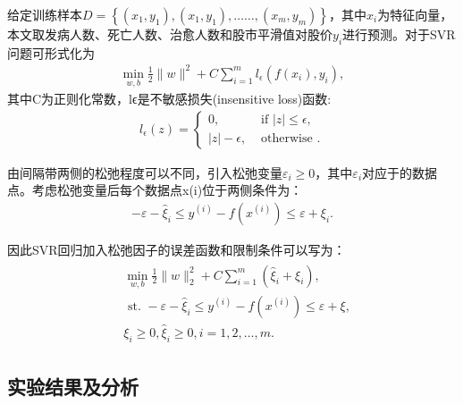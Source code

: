 \documentclass{whutmod}
\begin{document}
		给定训练样本$D=\left\{\left(x_{1}, y_{1}\right),\left(x_{1}, y_{1}\right), \ldots \ldots,\left(x_{m}, y_{m}\right)\right\}
		$，其中$x_i$为特征向量，本文取发病人数、死亡人数、治愈人数和股市平滑值对股价$y_i$进行预测。对于SVR问题可形式化为
				\begin{gather}
\min _{w, b} \frac{1}{2}\|w\|^{2}+C \sum_{i=1}^{m} l_{\epsilon}\left(f\left(x_{i}\right), y_{i}\right),
		\end{gather}
		其中C为正则化常数，lϵ是不敏感损失(insensitive loss)函数:
				\begin{gather*}
l_{\epsilon}(z)=\left\{\begin{array}{cc}
0, & \text { if }|z| \leq \epsilon ,\\
|z|-\epsilon, & \text { otherwise }.
\end{array}\right.
\end{gather*}

 由间隔带两侧的松弛程度可以不同，引入松弛变量$\varepsilon_i\geq 0$，其中$\varepsilon_i$对应于的数据点。考虑松弛变量后每个数据点x(i)位于两侧条件为：
 				\begin{gather*}
-\varepsilon-\hat{\xi}_{i} \leq y^{(i)}-f\left(x^{(i)}\right) \leq \varepsilon+\xi_{i} .
 \end{gather*}
 
         因此SVR回归加入松弛因子的误差函数和限制条件可以写为：
  				\begin{gather}
\begin{aligned}
&\min _{w, b} \frac{1}{2}\|w\|_{2}^{2}+C \sum_{i=1}^{m}\left(\hat{\xi}_{i}+\xi_{i}\right),\\
&\text { st. }-\varepsilon-\hat{\xi}_{i} \leq y^{(i)}-f\left(x^{(i)}\right) \leq \varepsilon+\xi,\\
&\xi_{i} \geq 0, \hat{\xi}_{i} \geq 0, i=1,2, \ldots, m.
\end{aligned}
 \end{gather}
 
 
        \subsection{实验结果及分析}
        
\end{document}
